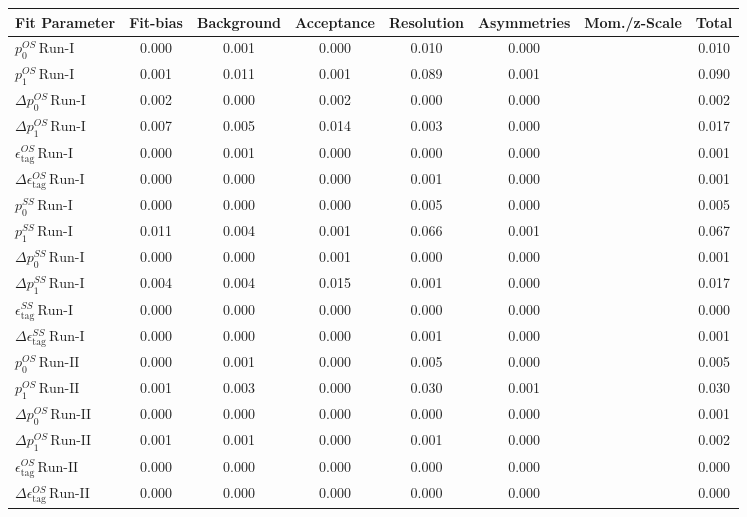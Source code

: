 \begin{tabular}{l  c  c  c  c  c  c  | c }
\hline
\hline
Fit Parameter & Fit-bias & Background & Acceptance & Resolution & Asymmetries & Mom./z-Scale &  Total  \\ 
\hline
$p_{0}^{OS} \, \text{Run-I}$ & 0.000 & 0.001 & 0.000 & 0.010 & 0.000 &  & 0.010 \\ 
$p_{1}^{OS} \, \text{Run-I}$ & 0.001 & 0.011 & 0.001 & 0.089 & 0.001 &  & 0.090 \\ 
$\Delta p_{0}^{OS} \, \text{Run-I}$ & 0.002 & 0.000 & 0.002 & 0.000 & 0.000 &  & 0.002 \\ 
$\Delta p_{1}^{OS} \, \text{Run-I}$ & 0.007 & 0.005 & 0.014 & 0.003 & 0.000 &  & 0.017 \\ 
$\epsilon_{\text{tag}}^{OS} \, \text{Run-I}$ & 0.000 & 0.001 & 0.000 & 0.000 & 0.000 &  & 0.001 \\ 
$\Delta \epsilon_{\text{tag}}^{OS} \, \text{Run-I}$ & 0.000 & 0.000 & 0.000 & 0.001 & 0.000 &  & 0.001 \\ 
$p_{0}^{SS} \, \text{Run-I}$ & 0.000 & 0.000 & 0.000 & 0.005 & 0.000 &  & 0.005 \\ 
$p_{1}^{SS} \, \text{Run-I}$ & 0.011 & 0.004 & 0.001 & 0.066 & 0.001 &  & 0.067 \\ 
$\Delta p_{0}^{SS} \, \text{Run-I}$ & 0.000 & 0.000 & 0.001 & 0.000 & 0.000 &  & 0.001 \\ 
$\Delta p_{1}^{SS} \, \text{Run-I}$ & 0.004 & 0.004 & 0.015 & 0.001 & 0.000 &  & 0.017 \\ 
$\epsilon_{\text{tag}}^{SS} \, \text{Run-I}$ & 0.000 & 0.000 & 0.000 & 0.000 & 0.000 &  & 0.000 \\ 
$\Delta \epsilon_{\text{tag}}^{SS} \, \text{Run-I}$ & 0.000 & 0.000 & 0.000 & 0.001 & 0.000 &  & 0.001 \\ 
$p_{0}^{OS} \, \text{Run-II}$ & 0.000 & 0.001 & 0.000 & 0.005 & 0.000 &  & 0.005 \\ 
$p_{1}^{OS} \, \text{Run-II}$ & 0.001 & 0.003 & 0.000 & 0.030 & 0.001 &  & 0.030 \\ 
$\Delta p_{0}^{OS} \, \text{Run-II}$ & 0.000 & 0.000 & 0.000 & 0.000 & 0.000 &  & 0.001 \\ 
$\Delta p_{1}^{OS} \, \text{Run-II}$ & 0.001 & 0.001 & 0.000 & 0.001 & 0.000 &  & 0.002 \\ 
$\epsilon_{\text{tag}}^{OS} \, \text{Run-II}$ & 0.000 & 0.000 & 0.000 & 0.000 & 0.000 &  & 0.000 \\ 
$\Delta \epsilon_{\text{tag}}^{OS} \, \text{Run-II}$ & 0.000 & 0.000 & 0.000 & 0.000 & 0.000 &  & 0.000 \\ 

\end{tabular}
